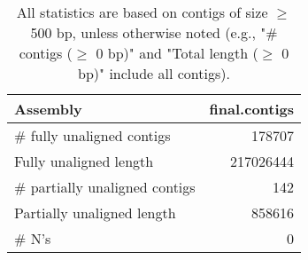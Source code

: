 \documentclass[12pt,a4paper]{article}
\begin{document}
\begin{table}[ht]
\begin{center}
\caption{All statistics are based on contigs of size $\geq$ 500 bp, unless otherwise noted (e.g., "\# contigs ($\geq$ 0 bp)" and "Total length ($\geq$ 0 bp)" include all contigs).}
\begin{tabular}{|l*{1}{|r}|}
\hline
Assembly & final.contigs \\ \hline
\# fully unaligned contigs & 178707 \\ \hline
Fully unaligned length & 217026444 \\ \hline
\# partially unaligned contigs & 142 \\ \hline
Partially unaligned length & 858616 \\ \hline
\# N's & 0 \\ \hline
\end{tabular}
\end{center}
\end{table}
\end{document}
